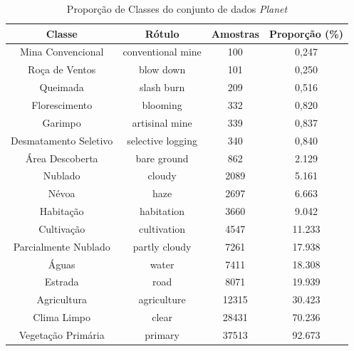 \begin{table}[h!]
    \caption{Proporção de Classes do conjunto de dados \textit{Planet}}
    \centering
\begin{tabular}{*{4}{c}}
    \toprule
    Classe                  &            Rótulo &  Amostras      &  Proporção (\%) \\
    \midrule
    Mina Convencional       & conventional mine &        100     &       0,247 \\
    Roça de Ventos          &         blow down &        101     &       0,250 \\
    Queimada                &        slash burn &        209     &       0,516 \\
    Florescimento           &          blooming &        332     &       0,820 \\
    Garimpo                 &    artisinal mine &        339     &       0,837 \\
    Desmatamento Seletivo   & selective logging &        340     &       0,840 \\
    Área Descoberta         &       bare ground &        862     &       2.129 \\
    Nublado                 &            cloudy &       2089     &       5.161 \\
    Névoa                   &              haze &       2697     &       6.663 \\
    Habitação               &        habitation &       3660     &       9.042 \\
    Cultivação              &       cultivation &       4547     &      11.233 \\
    Parcialmente Nublado    &     partly cloudy &       7261     &      17.938 \\
    Águas                   &             water &       7411     &      18.308 \\
    Estrada                 &              road &       8071     &      19.939 \\
    Agricultura             &       agriculture &      12315     &      30.423 \\
    Clima Limpo             &             clear &      28431     &      70.236 \\
    Vegetação Primária      &           primary &      37513     &      92.673 \\
    \bottomrule
\end{tabular}
\label{table:proporcao_classes}
\end{table}




